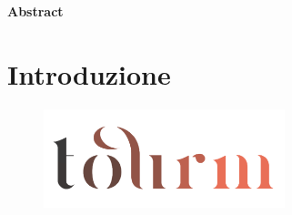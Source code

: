 \documentclass[12pt]{article}
\begin{document}
\newpage

\thispagestyle{plain}
\begin{center}
    \vfill
    \Huge
    \textbf{Abstract}
    \vspace{2cm}

\end{center}

\vfill


\newpage
\tableofcontents
\newpage

\section{Introduzione}
\begin{center}
    \begin{figure}[htp]
        \centering
        \includegraphics[width=7cm]{images/tourm_logo_transparent.png}
        \vspace{-2.7\baselineskip}
    \end{figure}
\end{center}
\end{document}
